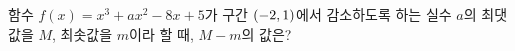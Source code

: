 함수 $f(x)=x^3+ax^2-8x+5$가 구간 $(-2{,}\mkern3mu\mathopen{}1)$에서 감소하도록 하는 실수 $a$의 최댓값을 $M$, 최솟값을 $m$이라 할 때, $M-m$의 값은?
